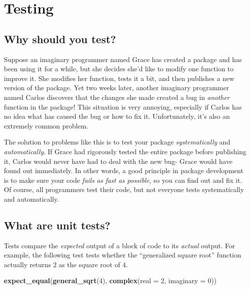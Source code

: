 \documentclass[]{book}
\newenvironment{Shaded}{\begin{snugshade}}{\end{snugshade}}
\newcommand{\KeywordTok}[1]{\textcolor[rgb]{0.13,0.29,0.53}{\textbf{#1}}}
\newcommand{\DataTypeTok}[1]{\textcolor[rgb]{0.13,0.29,0.53}{#1}}
\newcommand{\DecValTok}[1]{\textcolor[rgb]{0.00,0.00,0.81}{#1}}
\newcommand{\NormalTok}[1]{#1}
\begin{document}
\hypertarget{testing}{\section{Testing}\label{testing}}

\subsection{Why should you test?}\label{why-should-you-test}

Suppose an imaginary programmer named Grace has created a package and
has been using it for a while, but she decides she'd like to modify one
function to improve it. She modifies her function, tests it a bit, and
then publishes a new version of the package. Yet two weeks later,
another imaginary programmer named Carlos discovers that the changes she
made created a bug in \emph{another} function in the package! This
situation is very annoying, especially if Carlos has no idea what has
caused the bug or how to fix it. Unfortunately, it's also an extremely
common problem.

The solution to problems like this is to test your package
\emph{systematically} and \emph{automatically}. If Grace had rigorously
tested the entire package before publishing it, Carlos would never have
had to deal with the new bug- Grace would have found out immediately. In
other words, a good principle in package development is to make sure
your code \emph{fails as fast as possible,} so you can find out and fix
it. Of course, all programmers test their code, but not everyone tests
systematically and automatically.

\subsection{What are unit tests?}\label{what-are-unit-tests}

Tests compare the \emph{expected} output of a block of code to its
\emph{actual} output. For example, the following test tests whether the
``generalized square root'' function actually returns \(2\) as the
square root of \(4\).

\begin{Shaded}
\begin{Highlighting}[]
\KeywordTok{expect_equal}\NormalTok{(}\KeywordTok{general_sqrt}\NormalTok{(}\DecValTok{4}\NormalTok{), }\KeywordTok{complex}\NormalTok{(}\DataTypeTok{real =} \DecValTok{2}\NormalTok{, }\DataTypeTok{imaginary =} \DecValTok{0}\NormalTok{))}
\end{Highlighting}
\end{Shaded}
\end{document}
